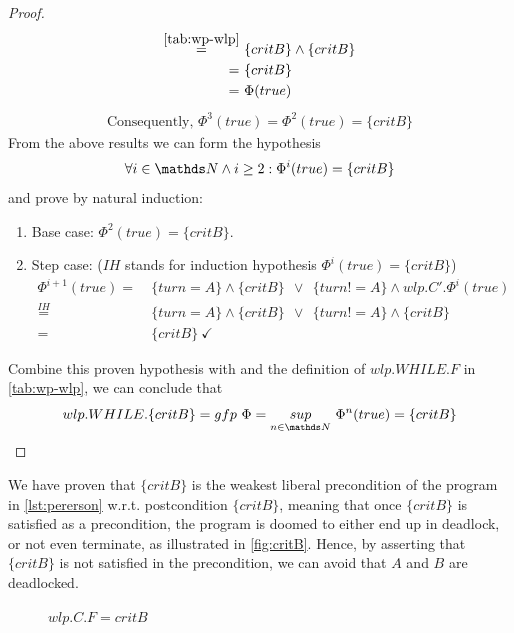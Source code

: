 \begin{proof}
\begin{align*}
		\overset{\autoref{tab:wp-wlp}}{=}&\ \{critB\}\wedge\{critB\}\\
		=&\ \{critB\}\\
		=&\ \Phi(true)\\
	\end{align*}
	\vspace{-15mm}
	\begin{align*}
		\text{Consequently, } \Phi^3(true) = \Phi^2(true) = \{critB\}
	\end{align*}
	From the above results we can form the hypothesis
	$$\forall i\in\N\wedge i\geq 2: \Phi^i(true)=\{critB\}$$
	and prove by natural induction: 
	\begin{enumerate}
		\item Base case: $\Phi^2(true) = \{critB\}$. \checkmark
		\item Step case: ($IH$ stands for induction hypothesis $\Phi^i(true)=\{critB\}$)
		\begin{align*}
			\Phi^{i+1}(true) =&\ \{turn=A\}\wedge \{critB\}\ \ \vee\ \ \{turn!=A\} \wedge wlp.C'.\Phi^i(true) \\ 
			\overset{IH}{=}&\ \{turn=A\}\wedge \{critB\}\ \ \vee\ \ \{turn!=A\} \wedge \{critB\} \\
			=&\ \{critB\}\ \checkmark
		\end{align*} 
	\end{enumerate}
	Combine this proven hypothesis with  and the definition of $wlp.WHILE.F$ in \autoref{tab:wp-wlp}, we can conclude that 
	$$wlp.WHILE.\{critB\}=gfp\ \Phi = \underset{n\in\N}{sup}\ \Phi^n(true) = \{critB\}$$
\end{proof}

We have proven that $\{critB\}$ is the weakest liberal precondition of the program in \autoref{lst:pererson} w.r.t. postcondition $\{critB\}$, meaning that once $\{critB\}$ is satisfied as a precondition, the program is doomed to either end up in deadlock, or not even terminate, as illustrated in \autoref{fig:critB}. 
Hence, by asserting that $\{critB\}$ is not satisfied in the precondition, we can avoid that $A$ and $B$ are deadlocked. 
\begin{figure}[ht]
	\centering
	
	\caption{$wlp.C.F = critB$}
	\label{fig:critB}
\end{figure}

